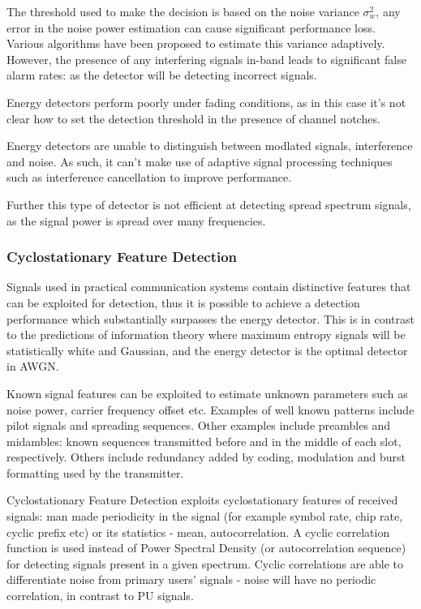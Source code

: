 The threshold used to make the decision is based on the noise variance \(\sigma_w^2\), any error in the noise power estimation can cause significant performance loss. Various algorithms have been proposed to estimate this variance adaptively. However, the presence of any interfering signals in-band leads to significant false alarm rates: as the detector will be detecting incorrect signals.

Energy detectors perform poorly under fading conditions, as in this case it's not clear how to set the detection threshold in the presence of channel notches. 

Energy detectors are unable to distinguish between modlated signals, interference and noise. As such, it can't make use of adaptive signal processing techniques such as interference cancellation to improve performance. 

Further this type of detector is not efficient at detecting spread spectrum signals, as the signal power is spread over many frequencies.

\subsubsection{Cyclostationary Feature Detection}
Signals used in practical communication systems contain distinctive features that can be exploited for detection, thus it is possible to achieve a detection performance which substantially surpasses the energy detector. This is in contrast to the predictions of information theory where maximum entropy signals will be statistically white and Gaussian, and the energy detector is the optimal detector in AWGN.

Known signal features can be exploited to estimate unknown parameters such as noise power, carrier frequency offset etc. Examples of well known patterns include pilot signals and spreading sequences. Other examples include preambles and midambles: known sequences transmitted before and in the middle of each slot, respectively. Others include redundancy added by coding, modulation and burst formatting used by the transmitter. 

Cyclostationary Feature Detection exploits cyclostationary features of received signals: man made periodicity in the signal (for example symbol rate, chip rate, cyclic prefix etc) or its statistics - mean, autocorrelation. A cyclic correlation function is used instead of Power Spectral Density (or autocorrelation sequence) for detecting signals present in a given spectrum. Cyclic correlations are able to differentiate noise from primary users' signals - noise will have no periodic correlation, in contrast to PU signals.

